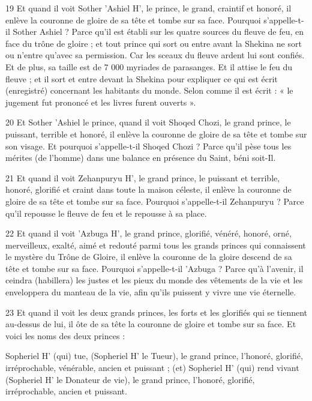 \par 19 Et quand il voit Sother 'Ashiel H', le prince, le grand, craintif et honoré, il enlève la couronne de gloire de sa tête et tombe sur sa face. Pourquoi s'appelle-t-il Sother Ashiel ? Parce qu'il est établi sur les quatre sources du fleuve de feu, en face du trône de gloire ; et tout prince qui sort ou entre avant la Shekina ne sort ou n'entre qu'avec sa permission. Car les sceaux du fleuve ardent lui sont confiés. Et de plus, sa taille est de 7 000 myriades de parasanges. Et il attise le feu du fleuve ; et il sort et entre devant la Shekina pour expliquer ce qui est écrit (enregistré) concernant les habitants du monde. Selon comme il est écrit : « le jugement fut prononcé et les livres furent ouverts ».

\par 20 Et Sother 'Ashiel le prince, quand il voit Shoqed Chozi, le grand prince, le puissant, terrible et honoré, il enlève la couronne de gloire de sa tête et tombe sur son visage. Et pourquoi s'appelle-t-il Shoqed Chozi ? Parce qu'il pèse tous les mérites (de l'homme) dans une balance en présence du Saint, béni soit-Il.

\par 21 Et quand il voit Zehanpuryu H', le grand prince, le puissant et terrible, honoré, glorifié et craint dans toute la maison céleste, il enlève la couronne de gloire de sa tête et tombe sur sa face. Pourquoi s'appelle-t-il Zehanpuryu ? Parce qu'il repousse le fleuve de feu et le repousse à sa place.

\par 22 Et quand il voit 'Azbuga H', le grand prince, glorifié, vénéré, honoré, orné, merveilleux, exalté, aimé et redouté parmi tous les grands princes qui connaissent le mystère du Trône de Gloire, il enlève la couronne de la gloire descend de sa tête et tombe sur sa face. Pourquoi s'appelle-t-il 'Azbuga ? Parce qu'à l'avenir, il ceindra (habillera) les justes et les pieux du monde des vêtements de la vie et les enveloppera du manteau de la vie, afin qu'ils puissent y vivre une vie éternelle.

\par 23 Et quand il voit les deux grands princes, les forts et les glorifiés qui se tiennent au-dessus de lui, il ôte de sa tête la couronne de gloire et tombe sur sa face. Et voici les noms des deux princes :

\par Sopheriel H' (qui) tue, (Sopheriel H' le Tueur), le grand prince, l'honoré, glorifié, irréprochable, vénérable, ancien et puissant ; (et) Sopheriel H' (qui) rend vivant (Sopheriel H' le Donateur de vie), le grand prince, l'honoré, glorifié, irréprochable, ancien et puissant.

